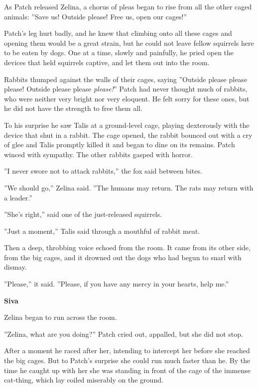 \documentclass[11pt]{article}
\begin{document}
 As Patch released Zelina, a chorus of pleas began to rise from all the other caged animals: ''Save us! Outside please! Free us, open our cages!''\par
 Patch's leg hurt badly, and he knew that climbing onto all these cages and opening them would be a great strain, but he could not leave fellow squirrels here to be eaten by dogs. One at a time, slowly and painfully, he pried open the devices that held squirrels captive, and let them out into the room.\par
Rabbits thumped against the walls of their cages, saying ''Outside please please please! Outside please please {\it please!}'' Patch had never thought much of rabbits, who were neither very bright nor very eloquent. He felt sorry for these ones, but he did not have the strength to free them all.\par
 To his surprise he saw Talis at a ground-level cage, playing dexterously with the device that shut in a rabbit. The cage opened, the rabbit bounced out with a cry of glee %
 and Talis promptly killed it and began to dine on its remains. Patch winced with sympathy. The other rabbits gasped with horror.\par
 ''I never swore not to attack rabbits,'' the fox said between bites.\par
 ''We should go,'' Zelina said. ''The humans may return. The rats may return with a leader.''\par
 ''She's right,'' said one of the just-released squirrels.\par
 ''Just a moment,'' Talis said through a mouthful of rabbit meat.\par
 Then a deep, throbbing voice echoed from the room. It came from its other side, from the big cages, and it drowned out the dogs who had begun to snarl with dismay.\par
 ''Please,'' it said. ''Please, if you have any mercy in your hearts, help me.''\par
\par
{\bf Siva\par
}\par
 Zelina began to run across the room.\par
 ''Zelina, what are you doing?'' Patch cried out, appalled, but she did not stop.\par
After a moment he raced after her, intending to intercept her before she reached the big cages. But to Patch's surprise she could run much faster than he. By the time he caught up with her she was standing in front of the cage of the immense cat-thing, which lay coiled miserably on the ground.\par
\end{document}
